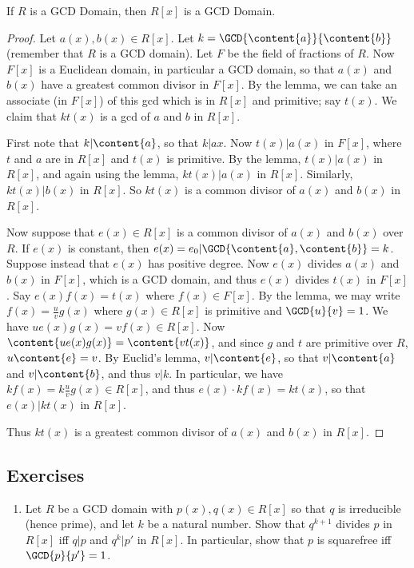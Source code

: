 \documentclass{article}
\begin{document}
\begin{prop}
If $R$ is a GCD Domain, then $R[x]$ is a GCD Domain.
\end{prop}

\begin{proof}
Let $a(x), b(x) \in R[x]$. Let $k = \GCD{\content{a}}{\content{b}}$ (remember that $R$ is a GCD domain). Let $F$ be the field of fractions of $R$. Now $F[x]$ is a Euclidean domain, in particular a GCD domain, so that $a(x)$ and $b(x)$ have a greatest common divisor in $F[x]$. By the lemma, we can take an associate (in $F[x]$) of this gcd which is in $R[x]$ and primitive; say $t(x)$. We claim that $kt(x)$ is a gcd of $a$ and $b$ in $R[x]$.

First note that $k|\content{a}$, so that $k|a{x}$. Now $t(x)|a(x)$ in $F[x]$, where $t$ and $a$ are in $R[x]$ and $t(x)$ is primitive. By the lemma, $t(x)|a(x)$ in $R[x]$, and again using the lemma, $kt(x)|a(x)$ in $R[x]$. Similarly, $kt(x)|b(x)$ in $R[x]$. So $kt(x)$ is a common divisor of $a(x)$ and $b(x)$ in $R[x]$.

Now suppose that $e(x) \in R[x]$ is a common divisor of $a(x)$ and $b(x)$ over $R$. If $e(x)$ is constant, then $e(x) = e_0 | \GCD{\content{a}, \content{b}} = k$. Suppose instead that $e(x)$ has positive degree. Now $e(x)$ divides $a(x)$ and $b(x)$ in $F[x]$, which is a GCD domain, and thus $e(x)$ divides $t(x)$ in $F[x]$. Say $e(x)f(x) = t(x)$ where $f(x) \in F[x]$. By the lemma, we may write $f(x) = \frac{u}{v}g(x)$ where $g(x) \in R[x]$ is primitive and $\GCD{u}{v} = 1$. We have $ue(x)g(x) = vf(x) \in R[x]$. Now $\content{ue(x)g(x)} = \content{vt(x)}$, and since $g$ and $t$ are primitive over $R$, $u\content{e} = v$. By Euclid's lemma, $v|\content{e}$, so that $v|\content{a}$ and $v|\content{b}$, and thus $v|k$. In particular, we have $kf(x) = k\frac{u}{v}g(x) \in R[x]$, and thus $e(x) \cdot kf(x) = kt(x)$, so that $e(x)|kt(x)$ in $R[x]$.

Thus $kt(x)$ is a greatest common divisor of $a(x)$ and $b(x)$ in $R[x]$.
\end{proof}

\subsection*{Exercises}

\begin{enumerate}
\item Let $R$ be a GCD domain with $p(x), q(x) \in R[x]$ so that $q$ is irreducible (hence prime), and let $k$ be a natural number. Show that $q^{k+1}$ divides $p$ in $R[x]$ iff $q|p$ and $q^k|p'$ in $R[x]$. In particular, show that $p$ is squarefree iff $\GCD{p}{p'} = 1$. 
\end{enumerate}
\end{document}
